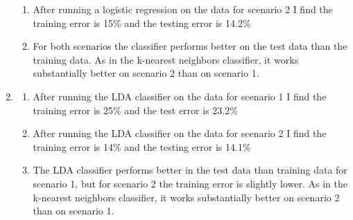 \documentclass{article}
\begin{document}
\begin{enumerate}
\begin{enumerate}
      \item After running a logistic regression on the data for scenario 2 I find the training error is 15\% and the testing error is 14.2\%
      \item For both scenarios the classifier performs better on the test data than the training data. As in the k-nearest neighbors classifier, it works substantially better on scenario 2 than on scenario 1.
    \end{enumerate}
  \item
    \begin{enumerate}
      \item After running the LDA classifier on the data for scenario 1 I find the training error is 25\% and the test error is 23.2\%
      \item After running the LDA classifier on the data for scenario 2 I find the training error is 14\% and the testing error is 14.1\%
      \item The LDA classifier performs better in the test data than training data for scenario 1, but for scenario 2 the training error is slightly lower. As in the k-nearest neighbors classifier, it works substantially better on scenario 2 than on scenario 1.
    \end{enumerate}
\end{enumerate}
\end{document}
